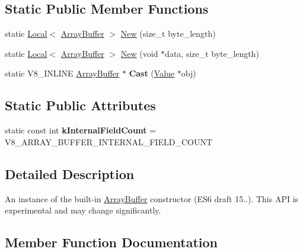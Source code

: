 \subsection*{Static Public Member Functions}
\begin{DoxyCompactItemize}
\item 
static \hyperlink{classv8_1_1_local}{Local}$<$ \hyperlink{classv8_1_1_array_buffer}{Array\+Buffer} $>$ \hyperlink{classv8_1_1_array_buffer_abd389f38c2e8aa1414e0312baeea9f05}{New} (size\+\_\+t byte\+\_\+length)
\item 
static \hyperlink{classv8_1_1_local}{Local}$<$ \hyperlink{classv8_1_1_array_buffer}{Array\+Buffer} $>$ \hyperlink{classv8_1_1_array_buffer_a7202b761fa822282af79258f0c5e231a}{New} (void $\ast$data, size\+\_\+t byte\+\_\+length)
\item 
\hypertarget{classv8_1_1_array_buffer_a4b0a703ae34217507a8ebc9cabf7336a}{}static V8\+\_\+\+I\+N\+L\+I\+N\+E \hyperlink{classv8_1_1_array_buffer}{Array\+Buffer} $\ast$ {\bfseries Cast} (\hyperlink{classv8_1_1_value}{Value} $\ast$obj)\label{classv8_1_1_array_buffer_a4b0a703ae34217507a8ebc9cabf7336a}

\end{DoxyCompactItemize}
\subsection*{Static Public Attributes}
\begin{DoxyCompactItemize}
\item 
\hypertarget{classv8_1_1_array_buffer_af49000a2ea120e49da846ef02a42ac69}{}static const int {\bfseries k\+Internal\+Field\+Count} = V8\+\_\+\+A\+R\+R\+A\+Y\+\_\+\+B\+U\+F\+F\+E\+R\+\_\+\+I\+N\+T\+E\+R\+N\+A\+L\+\_\+\+F\+I\+E\+L\+D\+\_\+\+C\+O\+U\+N\+T\label{classv8_1_1_array_buffer_af49000a2ea120e49da846ef02a42ac69}

\end{DoxyCompactItemize}


\subsection{Detailed Description}
An instance of the built-\/in \hyperlink{classv8_1_1_array_buffer}{Array\+Buffer} constructor (E\+S6 draft 15..). This A\+P\+I is experimental and may change significantly. 

\subsection{Member Function Documentation}
\hypertarget{classv8_1_1_array_buffer_ab73b98ba6436b57c5a1b3d29429e0199}{}

